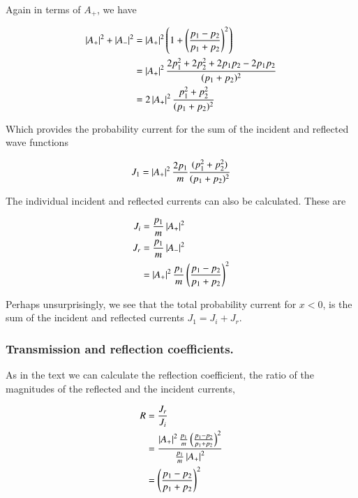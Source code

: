 \documentclass{article}
\begin{document}
Again in terms of $A_{+}$, we have

\begin{align*}
\left\lvert{A_{+} }\right\rvert^2 +\left\lvert{A_{-} }\right\rvert^2 
&=
\left\lvert{A_{+}}\right\rvert^2 \left( 1 + \left( \frac{ p_1 - p_2 }{p_1 + p_2} \right)^2 \right) \\
&=
\left\lvert{A_{+}}\right\rvert^2 
\frac{ 2 p_1^2 + 2 p_2^2 + 2 p_1 p_2 - 2 p_1 p_2 }{(p_1 + p_2)^2} \\
&=
2 \left\lvert{A_{+}}\right\rvert^2 \frac{ p_1^2 + p_2^2 }{(p_1 + p_2)^2} \\
\end{align*}

Which provides the probability current for the sum of the incident and reflected wave functions

\begin{align}\label{eqn:current1}
J_1
&=
\left\lvert{A_{+}}\right\rvert^2 
\frac{2 p_1}{m} 
\frac{ (p_1^2 + p_2^2) }{(p_1 + p_2)^2} \\
\end{align}

The individual incident and reflected currents can also be calculated.  These are

\begin{align*}
J_i &= \frac{ p_1}{m} \left\lvert{ A_{+} }\right\rvert^2 \\
J_r &= \frac{ p_1}{m} \left\lvert{ A_{-} }\right\rvert^2  \\
&= 
\left\lvert{ A_{+} }\right\rvert^2 
\frac{ p_1 }{m } 
\left( \frac{ p_1 - p_2 }{p_1 + p_2} \right)^2 
\end{align*}

Perhaps unsurprisingly, we see that the total probability current for $x<0$, is the sum of the incident and reflected
currents $J_1 = J_i + J_r$.

\subsubsection{ Transmission and reflection coefficients. }

As in the text we can calculate the reflection coefficient, the ratio of the magnitudes of the reflected and the incident currents,

\begin{align*}
R 
&= \frac{J_r}{J_i}  \\
&=
\frac{\left\lvert{ A_{+} }\right\rvert^2 
\frac{ p_1 }{m } 
\left( \frac{ p_1 - p_2 }{p_1 + p_2} \right)^2 }{
\frac{ p_1}{m} 
\left\lvert{ A_{+} }\right\rvert^2 } \\
&=
\left( \frac{ p_1 - p_2 }{p_1 + p_2} \right)^2 
\\
\end{align*}
\end{document}
